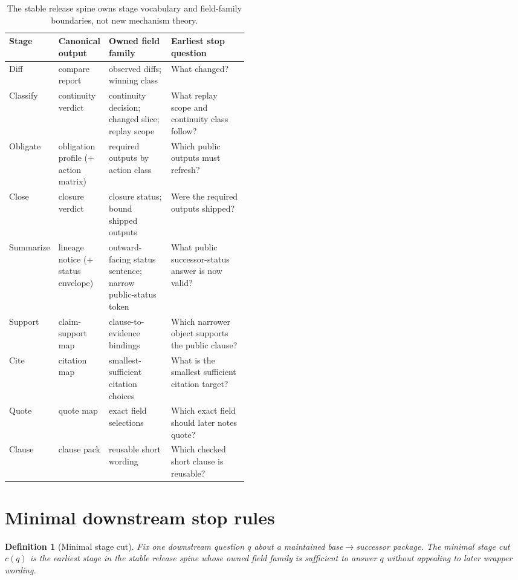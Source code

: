 \documentclass[11pt]{article}
\newtheorem{definition}{Definition}
\begin{document}
\begin{table}[t]
\centering
\footnotesize
\begin{tabularx}{\linewidth}{@{}l >{\raggedright\arraybackslash}p{0.20\linewidth} >{\raggedright\arraybackslash}p{0.26\linewidth} >{\raggedright\arraybackslash}X@{}}
\toprule
Stage & Canonical output & Owned field family & Earliest stop question \\
\midrule
Diff & compare report & observed diffs; winning class & What changed? \\
Classify & continuity verdict & continuity decision; changed slice; replay scope & What replay scope and continuity class follow? \\
Obligate & obligation profile (+ action matrix) & required outputs by action class & Which public outputs must refresh? \\
Close & closure verdict & closure status; bound shipped outputs & Were the required outputs shipped? \\
Summarize & lineage notice (+ status envelope) & outward-facing status sentence; narrow public-status token & What public successor-status answer is now valid? \\
Support & claim-support map & clause-to-evidence bindings & Which narrower object supports the public clause? \\
Cite & citation map & smallest-sufficient citation choices & What is the smallest sufficient citation target? \\
Quote & quote map & exact field selections & Which exact field should later notes quote? \\
Clause & clause pack & reusable short wording & Which checked short clause is reusable? \\
\bottomrule
\end{tabularx}
\caption{The stable release spine owns stage vocabulary and field-family boundaries, not new mechanism theory.}
\label{tab:spine}
\end{table}

\section{Minimal downstream stop rules}

\begin{definition}[Minimal stage cut]
Fix one downstream question $q$ about a maintained base$\to$successor package. The \emph{minimal stage cut} $c(q)$ is the earliest stage in the stable release spine whose owned field family is sufficient to answer $q$ without appealing to later wrapper wording.
\end{definition}
\end{document}

